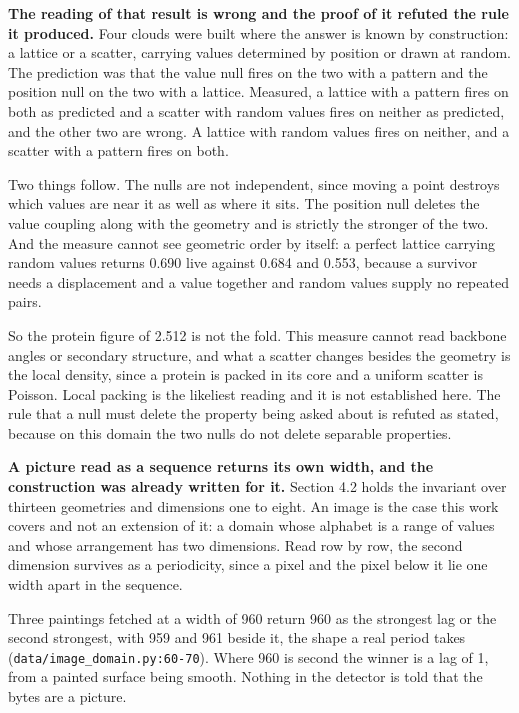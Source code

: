 \textbf{The reading of that result is wrong and the proof of it refuted the rule it produced.} Four clouds were built where the answer is known by construction: a lattice or a scatter, carrying values determined by position or drawn at random. The prediction was that the value null fires on the two with a pattern and the position null on the two with a lattice. Measured, a lattice with a pattern fires on both as predicted and a scatter with random values fires on neither as predicted, and the other two are wrong. A lattice with random values fires on neither, and a scatter with a pattern fires on both.

Two things follow. The nulls are not independent, since moving a point destroys which values are near it as well as where it sits. The position null deletes the value coupling along with the geometry and is strictly the stronger of the two. And the measure cannot see geometric order by itself: a perfect lattice carrying random values returns 0.690 live against 0.684 and 0.553, because a survivor needs a displacement and a value together and random values supply no repeated pairs.

So the protein figure of 2.512 is not the fold. This measure cannot read backbone angles or secondary structure, and what a scatter changes besides the geometry is the local density, since a protein is packed in its core and a uniform scatter is Poisson. Local packing is the likeliest reading and it is not established here. The rule that a null must delete the property being asked about is refuted as stated, because on this domain the two nulls do not delete separable properties.

\textbf{A picture read as a sequence returns its own width, and the construction was already written for it.} Section 4.2 holds the invariant over thirteen geometries and dimensions one to eight. An image is the case this work covers and not an extension of it: a domain whose alphabet is a range of values and whose arrangement has two dimensions. Read row by row, the second dimension survives as a periodicity, since a pixel and the pixel below it lie one width apart in the sequence.

Three paintings fetched at a width of 960 return 960 as the strongest lag or the second strongest, with 959 and 961 beside it, the shape a real period takes (\texttt{data/\allowbreak{}image\_\allowbreak{}domain.\allowbreak{}py:60-\allowbreak{}70}). Where 960 is second the winner is a lag of 1, from a painted surface being smooth. Nothing in the detector is told that the bytes are a picture.

